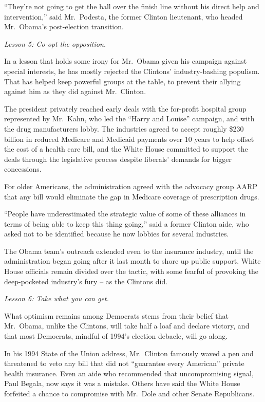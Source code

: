 ﻿\documentclass[12pt]{article}
\begin{document}
``They're not going to get the ball over the finish line without his direct help and intervention,''
said Mr.~Podesta, the former Clinton lieutenant, who headed Mr.~Obama's post-election transition.

\emph{Lesson 5: Co-opt the opposition.}


In a lesson that holds some irony for Mr.~Obama given his campaign against special interests, he has
mostly rejected the Clintons' industry-bashing populism. That has helped keep powerful groups at the
table, to prevent their allying against him as they did against Mr.~Clinton.

The president privately reached early deals with the for-profit hospital group represented by
Mr.~Kahn, who led the ``Harry and Louise'' campaign, and with the drug manufacturers lobby. The
industries agreed to accept roughly \$230 billion in reduced Medicare and Medicaid payments over 10
years to help offset the cost of a health care bill, and the White House committed to support the
deals through the legislative process despite liberals' demands for bigger concessions.

For older Americans, the administration agreed with the advocacy group AARP that any bill would
eliminate the gap in Medicare coverage of prescription drugs.

``People have underestimated the strategic value of some of these alliances in terms of being able
to keep this thing going,'' said a former Clinton aide, who asked not to be identified because he
now lobbies for several industries.

The Obama team's outreach extended even to the insurance industry, until the administration began
going after it last month to shore up public support. White House officials remain divided over the
tactic, with some fearful of provoking the deep-pocketed industry's fury -- as the Clintons did.

\emph{Lesson 6: Take what you can get.}

What optimism remains among Democrats stems from their belief that Mr.~Obama, unlike the Clintons,
will take half a loaf and declare victory, and that most Democrats, mindful of 1994's election
debacle, will go along.

In his 1994 State of the Union address, Mr.~Clinton famously waved a pen and threatened to veto any
bill that did not ``guarantee every American'' private health insurance. Even an aide who
recommended that uncompromising signal, Paul Begala, now says it was a mistake. Others have said the
White House forfeited\cite{forfeit} a chance to compromise with Mr.~Dole and other Senate Republicans.
\end{document}
